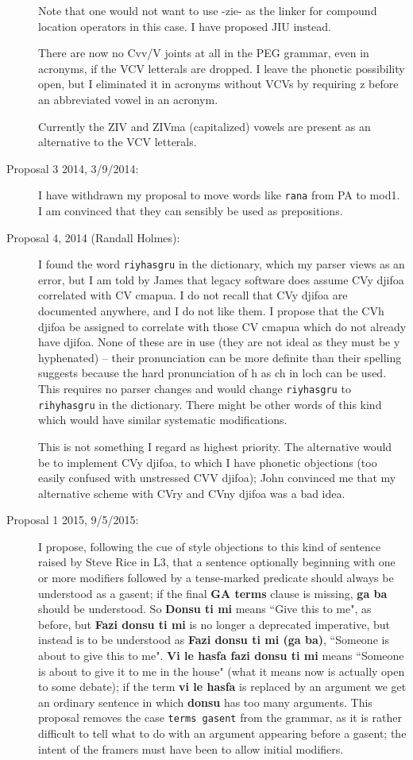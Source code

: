 \documentclass[12pt]{article}
\begin{document}
\begin{description}
Note that one would not want to use -zie- as the linker for compound location operators in this case.  I have proposed JIU instead.

There are now no Cvv/V joints at all in the PEG grammar, even in acronyms, if the VCV letterals are dropped.  I leave the phonetic possibility open, but I eliminated it
in acronyms without VCVs  by requiring z before an abbreviated vowel in an acronym.

Currently the ZIV and ZIVma (capitalized) vowels
are present as an alternative to the VCV letterals.

\item[Proposal 3 2014, 3/9/2014:]  I have withdrawn my proposal to move words like {\tt rana} from PA to mod1.  I am convinced that they can sensibly be used as prepositions.

\item[Proposal 4, 2014 (Randall Holmes):]  I found the word {\tt riyhasgru} in the dictionary, which my parser views as an error, but I am told by James that legacy software does assume CVy djifoa correlated with CV cmapua.  I do not recall that CVy djifoa are documented anywhere, and I do not like them.  I propose that the CVh djifoa be assigned to correlate with those CV cmapua which do not already have djifoa.  None of these are in use (they are not ideal as they must be y hyphenated) -- their pronunciation can be more definite than their spelling suggests because the hard pronunciation of h as ch in loch can be used.  This requires no parser changes and would change {\tt riyhasgru} to {\tt rihyhasgru} in the dictionary.  There might be other words of this kind which would have similar systematic modifications.

 This is not something I regard as highest priority.  The alternative would be to implement CVy djifoa, to which I have phonetic objections (too easily confused with unstressed CVV djifoa); John convinced me that my alternative scheme with CVry and
CVny djifoa was a bad idea.

\item[Proposal 1 2015, 9/5/2015:]  I propose, following the cue of style objections to this kind of sentence raised by Steve Rice in L3, that a sentence optionally beginning with one or more modifiers followed by a tense-marked predicate should always be understood as a gasent; if the final {\bf GA terms} clause is missing, {\bf ga ba} should be understood.   So
{\bf Donsu ti mi} means ``Give this to me", as before, but {\bf Fazi donsu ti mi} is  no longer a deprecated imperative, but instead is to be understood as
{\bf Fazi donsu ti mi (ga ba)}, ``Someone is about to give this to me".  {\bf Vi le hasfa fazi donsu ti mi} means ``Someone is about to give it to me in the house"  (what it means now
is actually open to some debate); if the term {\bf vi le hasfa} is replaced by an argument we get an ordinary sentence in which {\bf donsu} has too many arguments.  This
proposal removes the case {\tt terms gasent} from the grammar, as it is rather difficult to tell what to do with an argument appearing before a gasent; the intent of the framers
must have been to allow initial modifiers.


\end{description}
\end{document}
